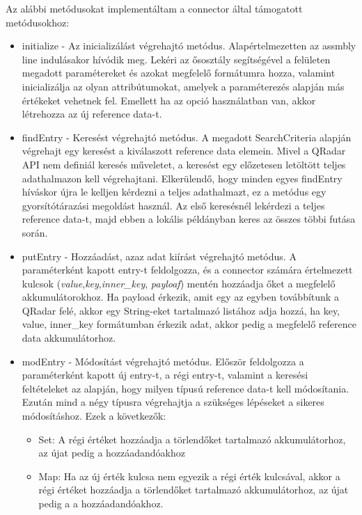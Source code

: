 Az alábbi metódusokat implementáltam a connector által támogatott metódusokhoz:

\begin{itemize}
	\item initialize - Az inicializálást végrehajtó metódus. Alapértelmezetten az assmbly line indulásakor hívódik meg. Lekéri az ősosztály segítségével a felületen megadott paramétereket és azokat megfelelő formátumra hozza, valamint inicializálja az olyan attribútumokat, amelyek a paraméterezés alapján más értékeket vehetnek fel. Emellett ha az opció használatban van, akkor létrehozza az új reference data-t.
	
	\item findEntry - Keresést végrehajtó metódus. A megadott SearchCriteria alapján végrehajt egy keresést a kiválaszott reference data elemein. Mivel a QRadar API nem definiál keresés műveletet, a keresést egy előzetesen letöltött teljes adathalmazon kell végrehajtani. Elkerülendő, hogy minden egyes findEntry híváskor újra le kelljen kérdezni a teljes adathalmazt, ez a metódus egy gyorsítótárazási megoldást használ. Az első keresésnél lekérdezi a teljes reference data-t, majd ebben a lokális példányban keres az összes többi futása során. 
	
	\item  putEntry - Hozzáadást, azaz adat kiírást végrehajtó metódus. A paraméterként kapott entry-t feldolgozza, és a connector számára értelmezett kulcsok (\textit{value},\textit{key},\textit{inner\_key}, \textit{payloaf}) mentén hozzáadja őket a megfelelő akkumulátorokhoz. Ha payload érkezik, amit egy az egyben továbbítunk a QRadar felé, akkor egy String-eket tartalmazó listához adja hozzá, ha key, value, inner\_key formátumban érkezik adat, akkor pedig a megfelelő reference data akkumulátorhoz.
	
	\item modEntry - Módosítást végrehajtó metódus. Először feldolgozza a paraméterként kapott új entry-t, a régi entry-t, valamint a keresési feltételeket az alapján, hogy milyen típusú reference data-t kell módosítania. Ezután mind a négy típusra végrehajtja a szükséges lépéseket a sikeres módosításhoz. Ezek a következők:
	\begin{itemize}
		\item Set: A régi értéket hozzáadja a törlendőket tartalmazó akkumulátorhoz, az újat pedig a hozzáadandóakhoz
		
		\item Map: Ha az új érték kulcsa nem egyezik a régi érték kulcsával, akkor a régi értéket hozzáadja a törlendőket tartalmazó akkumulátorhoz, az újat pedig a a hozzáadandóakhoz.
		

\end{itemize}
\end{itemize}
